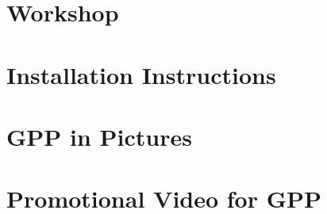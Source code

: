  \appendix

\chapter{Workshop}


\chapter{Installation Instructions}


%

\chapter{GPP in Pictures}


\chapter{Promotional Video for GPP}

